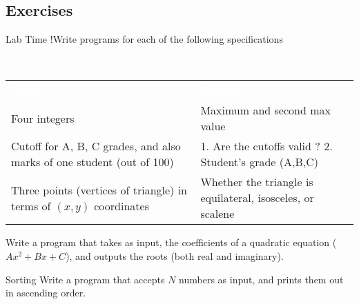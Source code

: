 \subsection{Exercises}

\begin{frame}[fragile]{Lab Time !}{Write programs for each of the following specifications}
    \begin{block}{~\vspace{0.5cm}}
    \begin{center}
    \vspace{-0.6cm}
    \begin{tabular}{p{}|p{}}
        \textcolor{white}{\bf Input} & \textcolor{white}{\bf Output} \\
        Four integers &
        Maximum and second max value \\ \hline
        Cutoff for A, B, C grades, and also marks of one student (out of 100) &
        1. Are the cutoffs valid ?\hfill\hspace{3em} 2. Student's grade (A,B,C) \\ \hline
        Three points (vertices of triangle) in terms of $(x,y)$ coordinates &
        Whether the triangle is equilateral, isosceles, or scalene
    \end{tabular}
    \end{center}
    \end{block}
    \begin{block}{}
        Write a program that takes as input, the coefficients of a quadratic equation
        ($Ax^2+Bx+C$), and outputs the roots (both real and imaginary).
    \end{block}
    \begin{block}{Sorting}
        Write a program that accepts $N$ numbers as input,
        and prints them out in ascending order.
    \end{block}
\end{frame}
